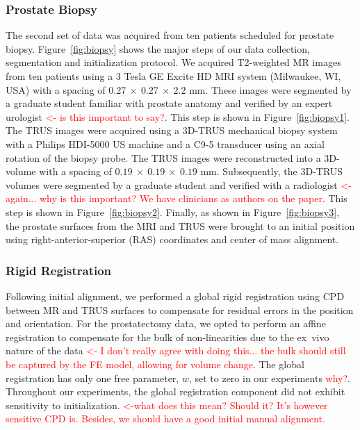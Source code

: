 \documentclass[journal]{IEEEtran}
\newcommand{\comment}[1]{\textcolor{red}{#1}}
\begin{document}
\subsubsection{Prostate Biopsy}\label{sec:data2}
The second set of data was acquired from ten patients scheduled for prostate biopsy. Figure~\ref{fig:biopsy} shows the major steps of our data collection, segmentation and initialization protocol. We acquired T2-weighted MR images from ten patients using a 3 Tesla GE Excite HD MRI system (Milwaukee, WI, USA) with a spacing of $0.27~\times~0.27~\times~2.2$ mm. These images were segmented by a graduate student familiar with prostate anatomy and verified by an expert urologist \comment{<- is this important to say?}. This step is shown in Figure~\ref{fig:biopsy1}. The TRUS images were acquired using a 3D-TRUS mechanical biopsy system~\cite{Bax08a} with a Philips HDI-5000 US machine and a C9-5 transducer using an axial rotation of the biopsy probe. The TRUS images were reconstructed into a 3D-volume with a spacing of $0.19~\times~0.19~\times~0.19$ mm. Subsequently, the 3D-TRUS volumes were segmented by a graduate student and verified with a radiologist \comment{<- again... why is this important?  We have clinicians as authors on the paper}. This step is shown in Figure~\ref{fig:biopsy2}. Finally, as shown in Figure~\ref{fig:biopsy3}, the prostate surfaces from the MRI and TRUS were brought to an initial position using right-anterior-superior (RAS) coordinates and center of mass alignment.
\subsubsection{Rigid Registration}\label{sec:data3}
Following initial alignment, we performed a global rigid registration using CPD~\cite{Myronenko10a} between MR and TRUS surfaces to compensate for residual errors in the position and orientation. For the prostatectomy data, we opted to perform an affine registration to compensate for the bulk of non-linearities due to the ex~vivo nature of the data \comment{<- I don't really agree with doing this... the bulk should still be captured by the FE model, allowing for volume change}. The global registration has only one free parameter, $w$, set to zero in our experiments \comment{why?}. Throughout our experiments, the global registration component did not exhibit sensitivity to initialization. \comment{<-what does this mean?  Should it?  It's however sensitive CPD is.  Besides, we should have a good initial manual alignment.}
\end{document}
